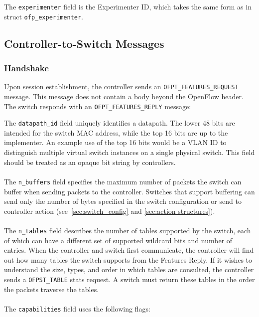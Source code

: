 
The \verb|experimenter| field is the Experimenter ID, which takes the same form as in struct \verb|ofp_experimenter|.

\subsection{Controller-to-Switch Messages}

\subsubsection{Handshake}
\label{cts:handshake} 
Upon session establishment, the controller sends an \verb|OFPT_FEATURES_REQUEST| message.  This message does not contain a body beyond the OpenFlow header.  The switch responds with an \verb|OFPT_FEATURES_REPLY| message:


The \verb|datapath_id| field uniquely identifies a datapath.  The lower 48 bits are intended for the switch MAC address, while the top 16 bits are up to the implementer.  An example use of the top 16 bits would be a VLAN ID to distinguish multiple virtual switch instances on a single physical switch.  This field should be treated as an opaque bit string by controllers.
\\\\
The \verb|n_buffers| field specifies the maximum number of packets the switch can buffer when sending packets to the controller. Switches that support buffering can send only the number of bytes specified in the switch configuration or send to controller action (see~\ref{sec:switch_config} and \ref{sec:action structures}).
\\\\
The \verb|n_tables| field describes the number of tables supported by the switch, each of which can have a different set of supported wildcard bits and number of entries.  When the controller and switch first communicate, the controller will find out how many tables the switch supports from the Features Reply. If it wishes to understand the size, types, and order in which tables are consulted, the controller sends a \verb|OFPST_TABLE| stats request. A switch must return these tables in the order the packets traverse the tables.
\\\\
The \verb|capabilities| field uses the following flags:

